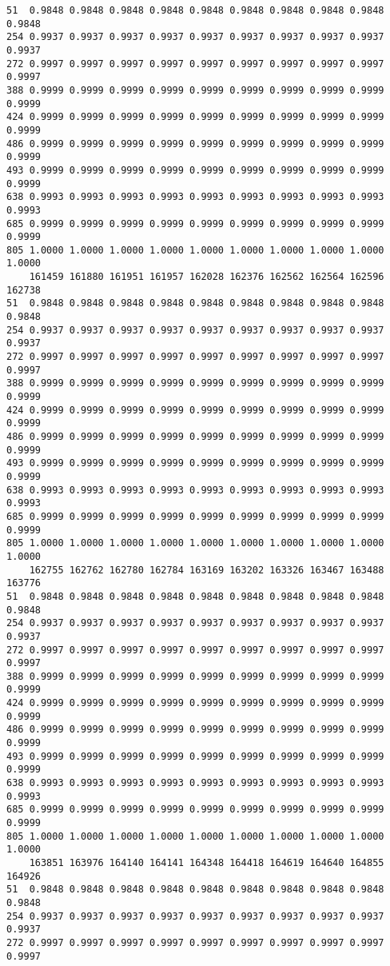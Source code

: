 \documentclass[
]{report}
\begin{document}
\begin{verbatim}
51  0.9848 0.9848 0.9848 0.9848 0.9848 0.9848 0.9848 0.9848 0.9848 0.9848
254 0.9937 0.9937 0.9937 0.9937 0.9937 0.9937 0.9937 0.9937 0.9937 0.9937
272 0.9997 0.9997 0.9997 0.9997 0.9997 0.9997 0.9997 0.9997 0.9997 0.9997
388 0.9999 0.9999 0.9999 0.9999 0.9999 0.9999 0.9999 0.9999 0.9999 0.9999
424 0.9999 0.9999 0.9999 0.9999 0.9999 0.9999 0.9999 0.9999 0.9999 0.9999
486 0.9999 0.9999 0.9999 0.9999 0.9999 0.9999 0.9999 0.9999 0.9999 0.9999
493 0.9999 0.9999 0.9999 0.9999 0.9999 0.9999 0.9999 0.9999 0.9999 0.9999
638 0.9993 0.9993 0.9993 0.9993 0.9993 0.9993 0.9993 0.9993 0.9993 0.9993
685 0.9999 0.9999 0.9999 0.9999 0.9999 0.9999 0.9999 0.9999 0.9999 0.9999
805 1.0000 1.0000 1.0000 1.0000 1.0000 1.0000 1.0000 1.0000 1.0000 1.0000
    161459 161880 161951 161957 162028 162376 162562 162564 162596 162738
51  0.9848 0.9848 0.9848 0.9848 0.9848 0.9848 0.9848 0.9848 0.9848 0.9848
254 0.9937 0.9937 0.9937 0.9937 0.9937 0.9937 0.9937 0.9937 0.9937 0.9937
272 0.9997 0.9997 0.9997 0.9997 0.9997 0.9997 0.9997 0.9997 0.9997 0.9997
388 0.9999 0.9999 0.9999 0.9999 0.9999 0.9999 0.9999 0.9999 0.9999 0.9999
424 0.9999 0.9999 0.9999 0.9999 0.9999 0.9999 0.9999 0.9999 0.9999 0.9999
486 0.9999 0.9999 0.9999 0.9999 0.9999 0.9999 0.9999 0.9999 0.9999 0.9999
493 0.9999 0.9999 0.9999 0.9999 0.9999 0.9999 0.9999 0.9999 0.9999 0.9999
638 0.9993 0.9993 0.9993 0.9993 0.9993 0.9993 0.9993 0.9993 0.9993 0.9993
685 0.9999 0.9999 0.9999 0.9999 0.9999 0.9999 0.9999 0.9999 0.9999 0.9999
805 1.0000 1.0000 1.0000 1.0000 1.0000 1.0000 1.0000 1.0000 1.0000 1.0000
    162755 162762 162780 162784 163169 163202 163326 163467 163488 163776
51  0.9848 0.9848 0.9848 0.9848 0.9848 0.9848 0.9848 0.9848 0.9848 0.9848
254 0.9937 0.9937 0.9937 0.9937 0.9937 0.9937 0.9937 0.9937 0.9937 0.9937
272 0.9997 0.9997 0.9997 0.9997 0.9997 0.9997 0.9997 0.9997 0.9997 0.9997
388 0.9999 0.9999 0.9999 0.9999 0.9999 0.9999 0.9999 0.9999 0.9999 0.9999
424 0.9999 0.9999 0.9999 0.9999 0.9999 0.9999 0.9999 0.9999 0.9999 0.9999
486 0.9999 0.9999 0.9999 0.9999 0.9999 0.9999 0.9999 0.9999 0.9999 0.9999
493 0.9999 0.9999 0.9999 0.9999 0.9999 0.9999 0.9999 0.9999 0.9999 0.9999
638 0.9993 0.9993 0.9993 0.9993 0.9993 0.9993 0.9993 0.9993 0.9993 0.9993
685 0.9999 0.9999 0.9999 0.9999 0.9999 0.9999 0.9999 0.9999 0.9999 0.9999
805 1.0000 1.0000 1.0000 1.0000 1.0000 1.0000 1.0000 1.0000 1.0000 1.0000
    163851 163976 164140 164141 164348 164418 164619 164640 164855 164926
51  0.9848 0.9848 0.9848 0.9848 0.9848 0.9848 0.9848 0.9848 0.9848 0.9848
254 0.9937 0.9937 0.9937 0.9937 0.9937 0.9937 0.9937 0.9937 0.9937 0.9937
272 0.9997 0.9997 0.9997 0.9997 0.9997 0.9997 0.9997 0.9997 0.9997 0.9997

\end{verbatim}
\end{document}
